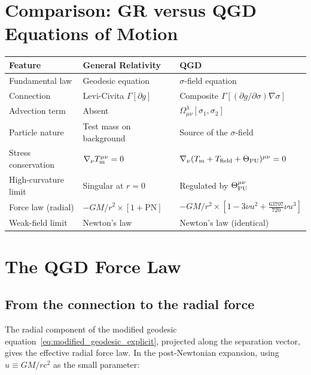 \documentclass[11pt,a4paper]{article}
\theoremstyle{plain}
\theoremstyle{definition}
\theoremstyle{remark}
\begin{document}
\section{Comparison: GR versus QGD Equations of Motion}
\label{sec:comparison}

\begin{center}
\renewcommand{\arraystretch}{1.5}
\begin{tabular}{p{4.5cm}p{5cm}p{5cm}}
\toprule
\textbf{Feature} & \textbf{General Relativity} & \textbf{QGD} \\
\midrule
Fundamental law &
  Geodesic equation &
  $\sigma$-field equation \\
Connection &
  Levi-Civita $\Gamma[\partial g]$ &
  Composite $\Gamma[(\partial g/\partial\sigma)\nabla\sigma]$ \\
Advection term &
  Absent &
  $\Omega^\lambda_{\mu\nu}[\sigma_1, \sigma_2]$ \\
Particle nature &
  Test mass on background &
  Source of the $\sigma$-field \\
Stress conservation &
  $\nabla_\nu T^{\mu\nu}_{\rm m} = 0$ &
  $\nabla_\nu(T_{\rm m} + T_{\rm field} + \Theta_{\rm PU})^{\mu\nu} = 0$ \\
High-curvature limit &
  Singular at $r = 0$ &
  Regulated by $\Theta^{\mu\nu}_{\rm PU}$ \\
Force law (radial) &
  $-GM/r^2 \times [1 + \text{PN}]$ &
  $-GM/r^2 \times [1 - 3\nu u^2 + \tfrac{63707}{720}\nu u^3]$ \\
Weak-field limit &
  Newton's law &
  Newton's law (identical) \\
\bottomrule
\end{tabular}
\end{center}

\section{The QGD Force Law}
\label{sec:force_law}

\subsection{From the connection to the radial force}

The radial component of the modified geodesic equation~\eqref{eq:modified_geodesic_explicit},
projected along the separation vector, gives the effective radial force law.  In the
post-Newtonian expansion, using $u \equiv GM/rc^2$ as the small parameter:
\end{document}

